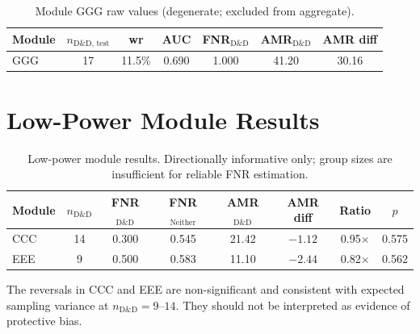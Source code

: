 \documentclass[12pt,a4paper]{article}
\begin{document}
\begin{table}[ht]
\centering
\caption{Module GGG raw values (degenerate; excluded from aggregate).}
\label{tab:ggg}
\small
\begin{tabular}{lcccccc}
\toprule
Module & $n_{\text{D\&D, test}}$ & wr & AUC & FNR$_{\text{D\&D}}$ &
AMR$_{\text{D\&D}}$ & AMR diff \\
\midrule
GGG & 17 & 11.5\% & 0.690 & 1.000 & 41.20 & 30.16 \\
\bottomrule
\end{tabular}
\end{table}

\section{Low-Power Module Results}
\label{app:lowpower}

\begin{table}[ht]
\centering
\caption{Low-power module results. Directionally informative only; group
sizes are insufficient for reliable FNR estimation.}
\label{tab:lowpower}
\small
\begin{tabular}{lccccccc}
\toprule
Module & $n_{\text{D\&D}}$ & FNR$_{\text{D\&D}}$ & FNR$_{\text{Neither}}$ &
AMR$_{\text{D\&D}}$ & AMR diff & Ratio & $p$ \\
\midrule
CCC & 14 & 0.300 & 0.545 & 21.42 & $-1.12$ & 0.95$\times$ & 0.575 \\
EEE &  9 & 0.500 & 0.583 & 11.10 & $-2.44$ & 0.82$\times$ & 0.562 \\
\bottomrule
\end{tabular}
\end{table}

The reversals in CCC and EEE are non-significant and consistent with expected
sampling variance at $n_{\text{D\&D}} = 9$--$14$. They should not be
interpreted as evidence of protective bias.



\end{document}
